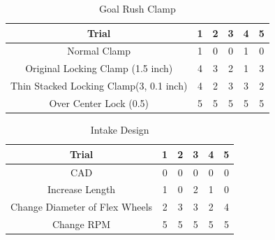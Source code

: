 \begin{table}
    \caption{Goal Rush Clamp}
    \centering
    \begin{tabular}{|c|c|c|c|c|c|}
        \hline
        Trial & 1 & 2 & 3 & 4 & 5\\
        \hline
         Normal Clamp & 1 & 0 & 0 & 1 & 0 \\
         \hline
         Original Locking Clamp (1.5 inch) & 4 & 3 & 2 & 1 & 3\\
         \hline
         Thin Stacked Locking Clamp(3, 0.1 inch) & 4 & 2 & 3 & 3 & 2\\
         \hline
         Over Center Lock (0.5) & 5 & 5 & 5 & 5 & 5\\
         \hline
    \end{tabular}
    \label{tab:GoalRushClamp}
\end{table}


\begin{table}
    \caption{Intake Design}
    \centering
    \begin{tabular}{|c|c|c|c|c|c|}
        \hline
        Trial & 1 & 2 & 3 & 4 & 5\\
        \hline
         CAD & 0 & 0 & 0 & 0 & 0 \\
         \hline
         Increase Length & 1 & 0 & 2 & 1 & 0\\
         \hline
         Change Diameter of Flex Wheels & 2 & 3 & 3 & 2 & 4\\
         \hline
         Change RPM & 5 & 5 & 5 & 5 & 5\\
         \hline
    \end{tabular}
    \label{tab:IntakeDesign}
\end{table}

\setcounter{tocdepth}{\defaulttocdepth}